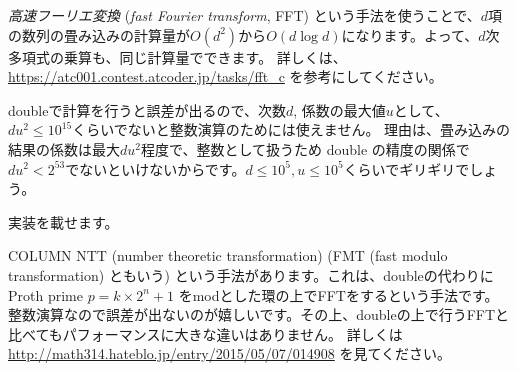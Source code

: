 \documentclass{jsarticle}
\begin{document}
  \emph{高速フーリエ変換} (\emph{fast Fourier transform}, FFT) という手法を使うことで、$d$項の数列の畳み込みの計算量が$O(d^2)$から$O(d \log d)$になります。よって、$d$次多項式の乗算も、同じ計算量でできます。
  詳しくは、\url{https://atc001.contest.atcoder.jp/tasks/fft_c} を参考にしてください。

  doubleで計算を行うと誤差が出るので、次数$d$, 係数の最大値$u$として、$du^2 \le 10^{15}$くらいでないと整数演算のためには使えません。
  理由は、畳み込みの結果の係数は最大$du^2$程度で、整数として扱うため double の精度の関係で $du^2 < 2^{53}$でないといけないからです。$d \le 10^5, u\le 10^5$くらいでギリギリでしょう。

  実装を載せます。
  

  \begin{itembox}[l]{COLUMN}
   NTT (number theoretic transformation) (FMT (fast modulo transformation) ともいう) という手法があります。これは、doubleの代わりに Proth prime $p = k \times 2^n + 1$ をmodとした環の上でFFTをするという手法です。
   整数演算なので誤差が出ないのが嬉しいです。その上、doubleの上で行うFFTと比べてもパフォーマンスに大きな違いはありません。
   詳しくは\url{http://math314.hateblo.jp/entry/2015/05/07/014908} を見てください。
  \end{itembox}
\end{document}
